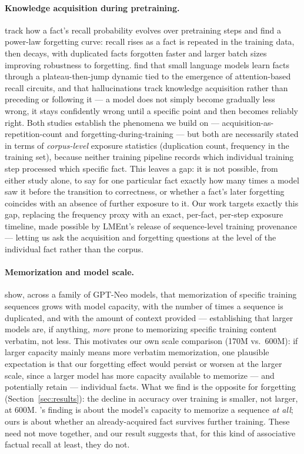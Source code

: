 \documentclass[11pt]{article}
\begin{document}
\paragraph{Knowledge acquisition during pretraining.} \citet{chang2024howdo} track how a fact's recall probability evolves over pretraining steps and find a power-law forgetting curve: recall rises as a fact is repeated in the training data, then decays, with duplicated facts forgotten faster and larger batch sizes improving robustness to forgetting. \citet{zucchet2025howdo} find that small language models learn facts through a plateau-then-jump dynamic tied to the emergence of attention-based recall circuits, and that hallucinations track knowledge acquisition rather than preceding or following it --- a model does not simply become gradually less wrong, it stays confidently wrong until a specific point and then becomes reliably right. Both studies establish the phenomena we build on --- acquisition-as-repetition-count and forgetting-during-training --- but both are necessarily stated in terms of \emph{corpus-level} exposure statistics (duplication count, frequency in the training set), because neither training pipeline records which individual training step processed which specific fact. This leaves a gap: it is not possible, from either study alone, to say for one particular fact exactly how many times a model saw it before the transition to correctness, or whether a fact's later forgetting coincides with an absence of further exposure to it. Our work targets exactly this gap, replacing the frequency proxy with an exact, per-fact, per-step exposure timeline, made possible by LMEnt's release of sequence-level training provenance --- letting us ask the acquisition and forgetting questions at the level of the individual fact rather than the corpus.

\paragraph{Memorization and model scale.} \citet{carlini2023quantifying} show, across a family of GPT-Neo models, that memorization of specific training sequences grows with model capacity, with the number of times a sequence is duplicated, and with the amount of context provided --- establishing that larger models are, if anything, \emph{more} prone to memorizing specific training content verbatim, not less. This motivates our own scale comparison (170M vs.\ 600M): if larger capacity mainly means more verbatim memorization, one plausible expectation is that our forgetting effect would persist or worsen at the larger scale, since a larger model has more capacity available to memorize --- and potentially retain --- individual facts. What we find is the opposite for forgetting (Section~\ref{sec:results}): the decline in accuracy over training is smaller, not larger, at 600M. \citeauthor{carlini2023quantifying}'s finding is about the model's capacity to memorize a sequence \emph{at all}; ours is about whether an already-acquired fact survives further training. These need not move together, and our result suggests that, for this kind of associative factual recall at least, they do not.
\end{document}
